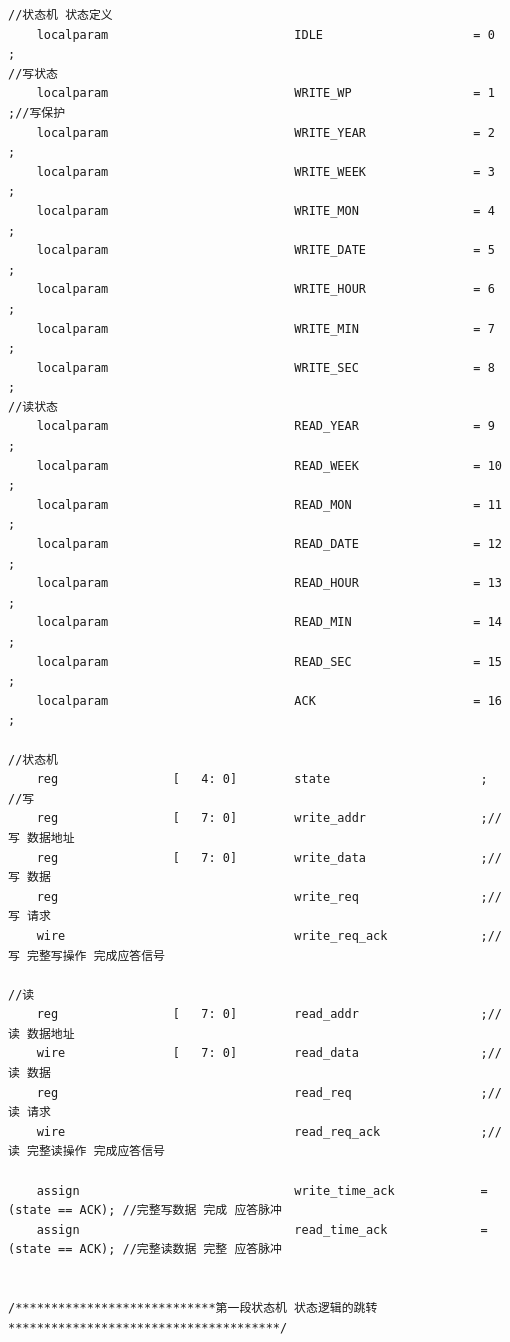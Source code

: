 \documentclass[a4paper,10pt]{article}
\begin{document}
\begin{lstlisting}[caption=ds1302_wr_drive.v]
//状态机 状态定义
    localparam                          IDLE                 	 = 0     ;
//写状态
    localparam                          WRITE_WP                 = 1     ;//写保护 
    localparam                          WRITE_YEAR               = 2     ;
    localparam                          WRITE_WEEK               = 3     ;
    localparam                          WRITE_MON                = 4     ;
    localparam                          WRITE_DATE               = 5     ;
    localparam                          WRITE_HOUR               = 6     ;
    localparam                          WRITE_MIN                = 7     ;
    localparam                          WRITE_SEC                = 8     ;
//读状态
    localparam                          READ_YEAR                = 9     ;
    localparam                          READ_WEEK                = 10    ;
    localparam                          READ_MON                 = 11    ;
    localparam                          READ_DATE                = 12    ;
    localparam                          READ_HOUR                = 13    ;
    localparam                          READ_MIN                 = 14    ;
    localparam                          READ_SEC                 = 15    ;
    localparam                          ACK                      = 16    ;	

//状态机
    reg                [   4: 0]        state                     ;
//写
    reg                [   7: 0]        write_addr                ;//写 数据地址
    reg                [   7: 0]        write_data                ;//写 数据
    reg                                 write_req                 ;//写 请求
	wire                                write_req_ack             ;//写 完整写操作 完成应答信号

//读
    reg                [   7: 0]        read_addr                 ;//读 数据地址
	wire               [   7: 0]        read_data                 ;//读 数据
    reg                                 read_req                  ;//读 请求
	wire                                read_req_ack              ;//读 完整读操作 完成应答信号

    assign                              write_time_ack            = (state == ACK); //完整写数据 完成 应答脉冲
    assign                              read_time_ack             = (state == ACK); //完整读数据 完整 应答脉冲


/****************************第一段状态机 状态逻辑的跳转**************************************/


\end{lstlisting}
\end{document}
